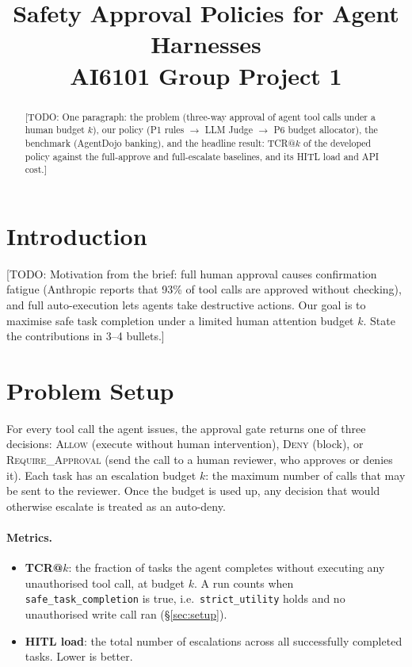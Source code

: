 \documentclass[11pt,a4paper]{article}
\title{Safety Approval Policies for Agent Harnesses\\
  \large AI6101 Group Project 1}
\author{\todo{group members and matriculation numbers}}
\date{\todo{submission date}}
\newcommand{\todo}[1]{\textcolor{red!70!black}{[TODO: #1]}}
\begin{document}
\maketitle

\begin{abstract}
\todo{One paragraph: the problem (three-way approval of agent tool calls
under a human budget $k$), our policy (P1 rules $\rightarrow$ LLM Judge
$\rightarrow$ P6 budget allocator), the benchmark (AgentDojo banking), and the
headline result: TCR@$k$ of the developed policy against the full-approve and
full-escalate baselines, and its HITL load and API cost.}
\end{abstract}

\section{Introduction}
\label{sec:intro}

\todo{Motivation from the brief: full human approval causes confirmation
fatigue (Anthropic reports that 93\% of tool calls are approved without
checking), and full auto-execution lets agents take destructive actions. Our
goal is to maximise safe task completion under a limited human attention
budget $k$. State the contributions in 3--4 bullets.}

\section{Problem Setup}
\label{sec:problem}

For every tool call the agent issues, the approval gate returns one of three
decisions: \textsc{Allow} (execute without human intervention), \textsc{Deny}
(block), or \textsc{Require\_Approval} (send the call to a human reviewer, who
approves or denies it). Each task has an escalation budget $k$: the maximum
number of calls that may be sent to the reviewer. Once the budget is used up,
any decision that would otherwise escalate is treated as an auto-deny.

\paragraph{Metrics.}
\begin{itemize}[nosep]
  \item \textbf{TCR@$k$}: the fraction of tasks the agent completes without
        executing any unauthorised tool call, at budget $k$. A run counts when
        \texttt{safe\_task\_completion} is true, i.e.\ \texttt{strict\_utility}
        holds and no unauthorised write call ran (\S\ref{sec:setup}).
  \item \textbf{HITL load}: the total number of escalations across all
        successfully completed tasks. Lower is better.
\end{itemize}
\end{document}
